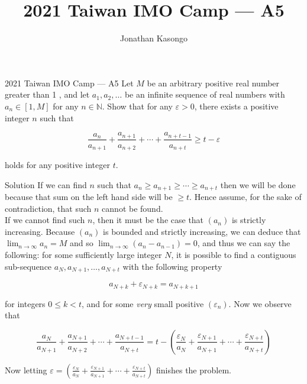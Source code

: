 \documentclass{article}
\author{Jonathan Kasongo}
\title{2021 Taiwan IMO Camp --- A5}
\begin{document}
\maketitle

\begin{problem}{2021 Taiwan IMO Camp --- A5}
Let $M$ be an arbitrary positive real number greater than 1 , and let $a_{1}, a_{2}, \ldots$ be an infinite sequence of real numbers with
$a_{n} \in[1, M]$ for any $n \in \mathbb{N}$. Show that for any $\varepsilon>0$, there exists a positive integer $n$ such that

$$
\frac{a_{n}}{a_{n+1}}+\frac{a_{n+1}}{a_{n+2}}+\cdots+\frac{a_{n+t-1}}{a_{n+t}} \geq t-\varepsilon
$$

holds for any positive integer $t$.
\end{problem}

\begin{solution}{Solution}
If we can find $n$ such that $a_n \geq a_{n+1} \geq \cdots \geq a_{n+t}$
then we will be done because that sum on the left hand side will be
$\geq t$. Hence assume, for the sake of contradiction, that such $n$ cannot
be found.\\

If we cannot find such $n$, then it must be the case that $(a_n)$ is
strictly increasing. Because $(a_n)$ is bounded and strictly increasing,
we can deduce that $\lim_{n \rightarrow \infty} a_n = M$ and so
$\lim_{n \rightarrow \infty} (a_n - a_{n-1}) = 0$, and thus
we can say the following: for some sufficiently large integer $N$, it is
possible to find a contiguous sub-sequence $a_N, a_{N+1}, \ldots, a_{N+t}$
with the following property

$$
a_{N + k} + \varepsilon_{N + k} = a_{N + k + 1}
$$

for integers $0 \leq k < t$, and for some \textit{very} small
positive $(\varepsilon_n)$. Now we observe that

$$
\frac{a_N}{a_{N+1}} + \frac{a_{N+1}}{a_{N+2}} + \cdots +
\frac{a_{N+t-1}}{a_{N+t}} =
t - \left(\frac{\varepsilon_N}{a_N} + \frac{\varepsilon_{N+1}}{a_{N+1}} +
\cdots + \frac{\varepsilon_{N+t}}{a_{N+t}} \right)
$$

Now letting $\varepsilon = \left(\frac{\varepsilon_N}{a_N} +
\frac{\varepsilon_{N+1}}{a_{N+1}} + \cdots +
\frac{\varepsilon_{N+t}}{a_{N+t}} \right)$ finishes the problem.
\end{solution}
\end{document}
